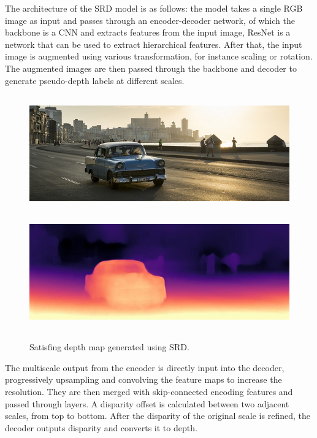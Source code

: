 \documentclass[12pt, letterpaper]{article}
\begin{document}
\begin{spacing}{1.15}
The architecture of the SRD model is as follows: the model takes a single RGB image as input and passes through an encoder-decoder network, of which the backbone is a CNN and extracts
features from the input image, ResNet is a network that can be used to extract hierarchical features. After that, the input image is augmented using various transformation, for instance 
scaling or rotation. The augmented images are then passed through the backbone and decoder to generate pseudo-depth labels at different scales.

\begin{figure}[!ht]
    \begin{center}
        \includegraphics[height = 5cm]{test_image}
        \includegraphics[height = 5cm]{test_image_disp}


        \caption{Satisfing depth map generated using SRD.}
        \label{SRDex}
    \end{center}
\end{figure}

The multiscale output from the encoder is directly input into the decoder, progressively upsampling and convolving the feature maps to increase the resolution. They are then merged with
skip-connected encoding features and passed through layers. A disparity offset is calculated between two adjacent scales, from top to bottom. After the disparity of the original scale is refined,
the decoder outputs disparity and converts it to depth.



\end{spacing}
\end{document}
